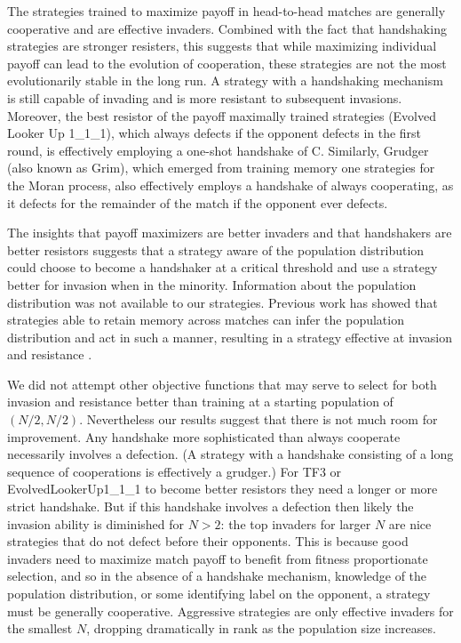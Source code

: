 \documentclass{article}
\begin{document}
The strategies trained to maximize payoff in head-to-head matches are generally
cooperative and are effective invaders.
Combined with the fact that handshaking strategies are stronger resisters,
this suggests that while maximizing individual payoff can lead to the evolution
of cooperation, these strategies are not the most evolutionarily stable
in the long run. A strategy with a handshaking mechanism is still capable of
invading and is more resistant to subsequent invasions. Moreover, the
best resistor of the payoff maximally trained strategies (Evolved Looker Up
1\_1\_1),
which always defects if the opponent defects in the first round, is effectively
employing a one-shot handshake of C. Similarly, Grudger (also known as Grim),
which emerged from training memory one strategies for the Moran process,
also effectively employs a handshake of always cooperating, as it defects
for the remainder of the match if the opponent ever defects.

The insights that payoff maximizers are better invaders and that handshakers
are better resistors suggests that a strategy
aware of the population distribution could choose to become a handshaker at
a critical threshold and use a strategy better for invasion when in the
minority. Information about the population distribution was not available
to our strategies. Previous work has showed that strategies able to retain
memory across matches can infer the population distribution and act in such
a manner, resulting in a strategy effective at invasion and resistance
\cite{Lee2015}.

We did not attempt other objective functions that may serve to select for both
invasion and resistance better than training at a starting population of
$(N/2, N/2)$. Nevertheless our results suggest that there is not much room for
improvement. Any handshake more sophisticated than always cooperate necessarily involves
a defection. (A strategy with a handshake consisting of a long sequence of cooperations is
effectively a grudger.) For TF3 or EvolvedLookerUp1\_1\_1 to become better resistors
they need a longer or more strict handshake. But if this handshake involves
a defection then likely the invasion ability is diminished for $N > 2$: the top
invaders for larger $N$ are nice strategies that do not defect before their
opponents. This is because good invaders need to maximize match payoff to benefit
from fitness proportionate selection,
and so in the absence of a handshake mechanism, knowledge of the population
distribution, or some identifying label on the opponent,
a strategy must be generally cooperative. Aggressive strategies
are only effective invaders for the smallest $N$, dropping dramatically in rank
as the population size increases.
\end{document}
